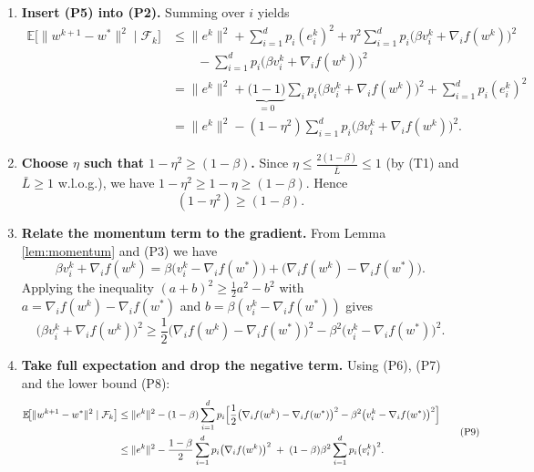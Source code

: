 \documentclass{article}
\newcommand{\E}{\mathbb{E}}
\begin{document}
\begin{enumerate}[label=[Step \arabic*], leftmargin=*]
\item \textbf{Insert (P5) into (P2).}  
Summing over $i$ yields
\[
\begin{aligned}
\E\!\bigl[\|w^{k+1}-w^{*}\|^{2}\mid\mathcal{F}_{k}\bigr]
&\le \|e^{k}\|^{2}
+\sum_{i=1}^{d}p_i(e^{k}_{i})^{2}
+\eta^{2}\sum_{i=1}^{d}p_i\bigl(\beta v_{i}^{k}+ \nabla_i f(w^{k})\bigr)^{2}\\
&\qquad -\sum_{i=1}^{d}p_i\bigl(\beta v_{i}^{k}+ \nabla_i f(w^{k})\bigr)^{2}\\
&= \|e^{k}\|^{2}
+\underbrace{\bigl(1-\!1\bigr)}_{=0}\!\sum_{i}p_i\bigl(\beta v_{i}^{k}+ \nabla_i f(w^{k})\bigr)^{2}
+\sum_{i=1}^{d}p_i(e^{k}_{i})^{2}\\
&= \|e^{k}\|^{2} - (1-\eta^{2})\sum_{i=1}^{d}p_i\bigl(\beta v_{i}^{k}+ \nabla_i f(w^{k})\bigr)^{2}.
\end{aligned}
\tag{P6}
\]

\item \textbf{Choose $\eta$ such that $1-\eta^{2}\ge (1-\beta)$.}
Since $\eta\le\frac{2(1-\beta)}{\bar L}\le 1$ (by (T1) and $\bar L\ge 1$ w.l.o.g.),
we have $1-\eta^{2}\ge 1-\eta\ge (1-\beta)$. Hence
\[
(1-\eta^{2})\ge (1-\beta).
\tag{P7}
\]

\item \textbf{Relate the momentum term to the gradient.}  
From Lemma \ref{lem:momentum} and (P3) we have
\[
\beta v_{i}^{k}+ \nabla_i f(w^{k})
= \beta\bigl(v_{i}^{k}-\nabla_i f(w^{*})\bigr)
+ \bigl(\nabla_i f(w^{k})-\nabla_i f(w^{*})\bigr).
\]
Applying the inequality $(a+b)^{2}\ge \frac{1}{2}a^{2}-b^{2}$ with
$a=\nabla_i f(w^{k})-\nabla_i f(w^{*})$ and $b=\beta(v_{i}^{k}-\nabla_i f(w^{*}))$ gives
\[
\bigl(\beta v_{i}^{k}+ \nabla_i f(w^{k})\bigr)^{2}
\ge \frac{1}{2}\bigl(\nabla_i f(w^{k})-\nabla_i f(w^{*})\bigr)^{2}
-\beta^{2}\bigl(v_{i}^{k}-\nabla_i f(w^{*})\bigr)^{2}.
\tag{P8}
\]

\item \textbf{Take full expectation and drop the negative term.}  
Using (P6), (P7) and the lower bound (P8):
\[
\begin{aligned}
\E\!\bigl[\|w^{k+1}-w^{*}\|^{2}\mid\mathcal{F}_{k}\bigr]
&\le \|e^{k}\|^{2}
-(1-\beta)\sum_{i=1}^{d}p_i\Bigl[
\frac{1}{2}\bigl(\nabla_i f(w^{k})-\nabla_i f(w^{*})\bigr)^{2}
-\beta^{2}\bigl(v_{i}^{k}-\nabla_i f(w^{*})\bigr)^{2}
\Bigr]\\
&\le \|e^{k}\|^{2}
-\frac{1-\beta}{2}\sum_{i=1}^{d}p_i\bigl(\nabla_i f(w^{k})\bigr)^{2}
\;+\;(1-\beta)\beta^{2}\sum_{i=1}^{d}p_i\bigl(v_{i}^{k}\bigr)^{2}.
\end{aligned}
\tag{P9}
\]


\end{enumerate}
\end{document}
